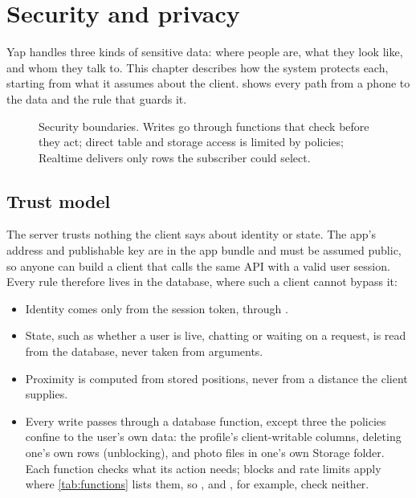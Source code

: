 \chapter{Security and privacy}
\label{ch:security}

Yap handles three kinds of sensitive data: where people are, what they look like, and whom they talk
to. This chapter describes how the system protects each, starting from what it assumes about the client.
 shows every path from a phone to the data and the rule that guards it.

\begin{figure}[ht]
  \centering
  
  \caption{Security boundaries. Writes go through functions that check before they act; direct table and
    storage access is limited by policies; Realtime delivers only rows the subscriber could select.}
  \label{fig:security}
\end{figure}

\section{Trust model}

The server trusts nothing the client says about identity or state. The app's address and publishable
key are in the app bundle and must be assumed public, so anyone can build a client that calls the same
API with a valid user session. Every rule therefore lives in the database, where such a client cannot
bypass it:

\begin{itemize}
  \item Identity comes only from the session token, through .
  \item State, such as whether a user is live, chatting or waiting on a request, is read from the
    database, never taken from arguments.
  \item Proximity is computed from stored positions, never from a distance the client supplies.
  \item Every write passes through a database function, except three the policies confine to the user's
    own data: the profile's client-writable columns, deleting one's own  rows (unblocking),
    and photo files in one's own Storage folder. Each function checks what its action needs; blocks and
    rate limits apply where \cref{tab:functions} lists them, so , 
    and , for example, check neither.
\end{itemize}

